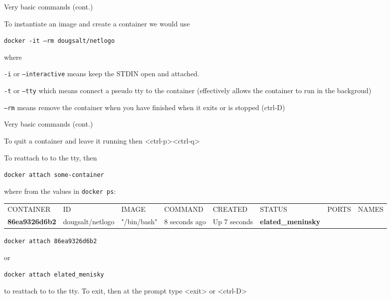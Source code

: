 \documentclass[usenames,dvipsnames,10pt]{beamer}
\begin{document}
\begin{frame}{Very basic commands (cont.)}

    To instantiate an image and create a container we would use

    \vfill
    {\color{blue}\texttt{docker -it --rm dougsalt/netlogo}}

    \vfill
    where 

    \vfill
    {\color{blue}\texttt{-i}} or {\color{blue}\texttt{---interactive}} means
    keep the STDIN open and attached.

    {\color{blue}\texttt{-t}} or {\color{blue}\texttt{--tty}} which means
    connect a pseudo tty to the container (effectively allows the container to
    run in the backgroud)

    {\color{blue}\texttt{--rm}}  means remove the container when you have
    finished when it exits or is stopped (ctrl-D)

    \vfill

\end{frame}


\begin{frame}{Very basic commands (cont.)}

    \vfill
    To quit a container and leave it running then <ctrl-p><ctrl-q>

    \vfill
    To reattach to to the tty, then

    \vfill
    {\color{blue}\texttt{docker attach some-container}}

    \vfill
    where from the values in {\color{blue}\texttt{docker ps}}:

    \tiny
    \begin{flushleft}
    \begin{tabularx}{\columnwidth}{l l l l l l l l}
    CONTAINER & ID & IMAGE & COMMAND & CREATED & STATUS & PORTS & NAMES \\
    \textbf{86ea9326d6b2} & dougsalt/netlogo & "/bin/bash" & 8 seconds ago & Up 7 seconds & \textbf{elated\_meninsky} \\
    \end{tabularx}
    \end{flushleft}
    \normalsize

    {\color{blue}\texttt{docker attach 86ea9326d6b2}} 

    or 

    {\color{blue}\texttt{docker attach elated\_menisky}} 

    to reattach to to the tty.
    To exit, then at the prompt type <exit> or <ctrl-D>
    \vfill

\end{frame}
\end{document}
